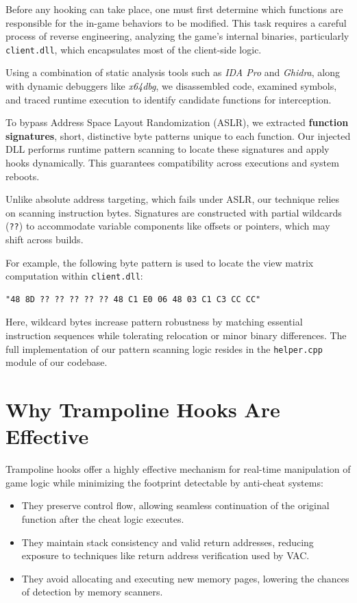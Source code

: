 Before any hooking can take place, one must first determine which functions are responsible for the in-game behaviors to be modified.  
This task requires a careful process of reverse engineering, analyzing the game's internal binaries, particularly \texttt{client.dll}, which encapsulates most of the client-side logic.

Using a combination of static analysis tools such as \textit{IDA Pro} and \textit{Ghidra}, along with dynamic debuggers like \textit{x64dbg}, we disassembled code, examined symbols, and traced runtime execution to identify candidate functions for interception.

To bypass Address Space Layout Randomization (ASLR), we extracted \textbf{function signatures}, short, distinctive byte patterns unique to each function.  
Our injected DLL performs runtime pattern scanning to locate these signatures and apply hooks dynamically. This guarantees compatibility across executions and system reboots.

Unlike absolute address targeting, which fails under ASLR, our technique relies on scanning instruction bytes.  
Signatures are constructed with partial wildcards (\texttt{??}) to accommodate variable components like offsets or pointers, which may shift across builds.

For example, the following byte pattern is used to locate the view matrix computation within \texttt{client.dll}:

\begin{lstlisting}[style=cppstyle]
"48 8D ?? ?? ?? ?? ?? 48 C1 E0 06 48 03 C1 C3 CC CC"
\end{lstlisting}

Here, wildcard bytes increase pattern robustness by matching essential instruction sequences while tolerating relocation or minor binary differences.  
The full implementation of our pattern scanning logic resides in the \texttt{helper.cpp} module of our codebase.

\section{Why Trampoline Hooks Are Effective}

Trampoline hooks offer a highly effective mechanism for real-time manipulation of game logic while minimizing the footprint detectable by anti-cheat systems:

\begin{itemize}
  \item They preserve control flow, allowing seamless continuation of the original function after the cheat logic executes.
  \item They maintain stack consistency and valid return addresses, reducing exposure to techniques like return address verification used by VAC.
  \item They avoid allocating and executing new memory pages, lowering the chances of detection by memory scanners.
\end{itemize}

